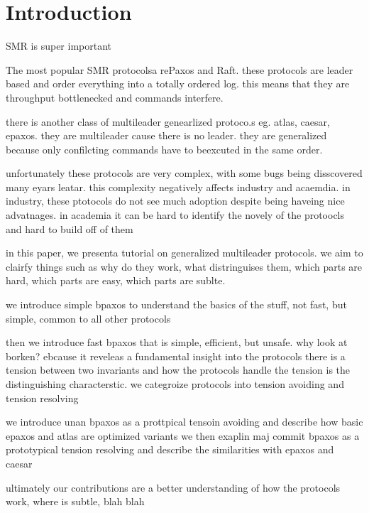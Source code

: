\section{Introduction}

SMR is super important

The most popular SMR protocolsa rePaxos and Raft. these protocols are leader
based and order everything into a totally ordered log. this means that they are
throughput bottlenecked and commands interfere.

there is another class of multileader genearlized protoco.s eg. atlas, caesar, epaxos. they are
multileader cause there is no leader. they are generalized because only
confilcting commands have to beexcuted in the same order.

unfortunately these protocols are very complex, with some bugs being disscovered many eyars leatar. this complexity negatively affects industry and acaemdia. in industry, these ptotocols do not see much adoption despite being haveing nice advatnages. in academia it can be hard to identify the novely of the protoocls and hard to build off of them

in this paper, we presenta tutorial on generalized multileader protocols. we aim to clairfy things such as why do they work, what distringuises them, which parts are hard, which parts are easy, which parts are sublte.

we introduce simple bpaxos to understand the basics of the stuff, not fast, but simple, common to all other protocols

then we introduce fast bpaxos that is simple, efficient, but unsafe. why look at borken? ebcause it reveleas a fundamental insight into the protocols there is a tension between two invariants and how the protocols  handle the tension is the distinguishing characterstic. we categroize protocols into tension avoiding and tension resolving

we introduce unan bpaxos as a prottpical tensoin avoiding and describe how basic epaxos and atlas are optimized variants
we then exaplin maj commit bpaxos as a prototypical tension resolving and describe the similarities with epaxos and caesar

ultimately our contributions are a better understanding of how the protocols work, where is subtle, blah blah

